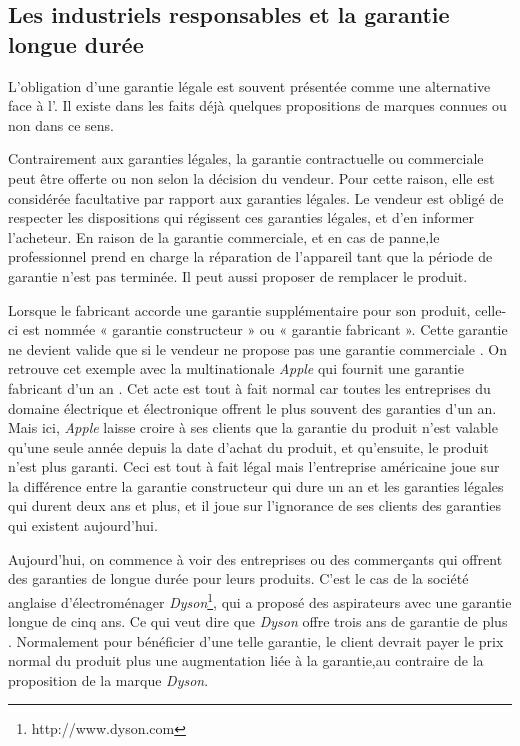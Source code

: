 \subsection{Les industriels responsables et la garantie longue durée}


L'obligation d'une garantie légale est souvent présentée comme une alternative face à l'\op. Il existe dans les faits déjà quelques propositions de marques connues ou non dans ce sens.

\bigbreak
Contrairement aux garanties légales, la garantie contractuelle ou commerciale peut être offerte ou non selon la décision du vendeur. Pour cette raison, elle est considérée facultative par rapport aux garanties légales. Le vendeur est obligé de respecter les dispositions qui régissent ces garanties légales, et d'en informer l'acheteur. 
En raison de la garantie commerciale, et en cas de panne,le professionnel prend en charge la réparation de l'appareil tant que la période de garantie n'est pas terminée. Il peut aussi proposer de remplacer le produit.


\bigbreak
Lorsque le fabricant accorde une garantie supplémentaire pour son produit, celle-ci est nommée « garantie constructeur » ou « garantie fabricant ». Cette garantie ne devient valide que si le vendeur ne propose pas une garantie commerciale \cite{loigarantie}.
On retrouve cet exemple avec la multinationale \textit{Apple} qui fournit une garantie fabricant d'un an \cite{apple}. Cet acte est tout à fait normal car toutes les entreprises du domaine électrique et électronique offrent le plus souvent des garanties d'un an. Mais ici, \textit{Apple} laisse croire à ses clients que la garantie du produit n'est valable qu'une seule année depuis la date d'achat du produit, et qu'ensuite, le produit n'est plus garanti. Ceci est tout à fait légal mais l'entreprise américaine joue sur la différence entre la garantie constructeur qui dure un an et les garanties légales qui durent deux ans et plus, et il joue sur l'ignorance de ses clients des garanties qui existent aujourd'hui.


\bigbreak
Aujourd'hui, on commence à voir des entreprises ou des commerçants qui offrent des garanties de longue durée pour leurs produits. C'est le cas de la société anglaise d'électroménager \textit{Dyson}\footnote{http://www.dyson.com}, qui a proposé des aspirateurs avec une garantie longue de cinq ans. Ce qui veut dire que \textit{Dyson} offre trois ans de garantie de plus \cite{dyson}. Normalement pour bénéficier d'une telle garantie, le client devrait payer le prix normal du produit plus une augmentation liée à la garantie,au contraire de la proposition de la marque \textit{Dyson}.


